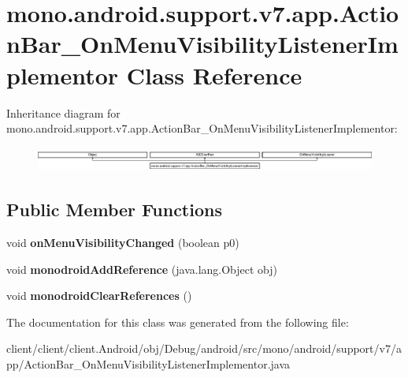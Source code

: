 \hypertarget{classmono_1_1android_1_1support_1_1v7_1_1app_1_1ActionBar__OnMenuVisibilityListenerImplementor}{}\section{mono.\+android.\+support.\+v7.\+app.\+Action\+Bar\+\_\+\+On\+Menu\+Visibility\+Listener\+Implementor Class Reference}
\label{classmono_1_1android_1_1support_1_1v7_1_1app_1_1ActionBar__OnMenuVisibilityListenerImplementor}
Inheritance diagram for mono.\+android.\+support.\+v7.\+app.\+Action\+Bar\+\_\+\+On\+Menu\+Visibility\+Listener\+Implementor\+:\begin{figure}[H]
\begin{center}
\leavevmode
\includegraphics[height=0.809834cm]{classmono_1_1android_1_1support_1_1v7_1_1app_1_1ActionBar__OnMenuVisibilityListenerImplementor}
\end{center}
\end{figure}
\subsection*{Public Member Functions}
\begin{DoxyCompactItemize}
\item 
\hypertarget{classmono_1_1android_1_1support_1_1v7_1_1app_1_1ActionBar__OnMenuVisibilityListenerImplementor_a273ad4963b11410f46b1e918b47526e5}{}void {\bfseries on\+Menu\+Visibility\+Changed} (boolean p0)\label{classmono_1_1android_1_1support_1_1v7_1_1app_1_1ActionBar__OnMenuVisibilityListenerImplementor_a273ad4963b11410f46b1e918b47526e5}

\item 
\hypertarget{classmono_1_1android_1_1support_1_1v7_1_1app_1_1ActionBar__OnMenuVisibilityListenerImplementor_a120bb639390d4992edfcf6749c839108}{}void {\bfseries monodroid\+Add\+Reference} (java.\+lang.\+Object obj)\label{classmono_1_1android_1_1support_1_1v7_1_1app_1_1ActionBar__OnMenuVisibilityListenerImplementor_a120bb639390d4992edfcf6749c839108}

\item 
\hypertarget{classmono_1_1android_1_1support_1_1v7_1_1app_1_1ActionBar__OnMenuVisibilityListenerImplementor_a888aa1c7efc221057deab7c4d44d1e86}{}void {\bfseries monodroid\+Clear\+References} ()\label{classmono_1_1android_1_1support_1_1v7_1_1app_1_1ActionBar__OnMenuVisibilityListenerImplementor_a888aa1c7efc221057deab7c4d44d1e86}

\end{DoxyCompactItemize}


The documentation for this class was generated from the following file\+:\begin{DoxyCompactItemize}
\item 
client/client/client.\+Android/obj/\+Debug/android/src/mono/android/support/v7/app/Action\+Bar\+\_\+\+On\+Menu\+Visibility\+Listener\+Implementor.\+java\end{DoxyCompactItemize}

